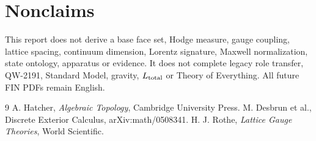 \documentclass[11pt,a4paper]{article}
\begin{document}
\section{Nonclaims}
This report does not derive a base face set, Hodge measure, gauge coupling,
lattice spacing, continuum dimension, Lorentz signature, Maxwell normalization,
state ontology, apparatus or evidence.  It does not complete legacy role
transfer, QW-2191, Standard Model, gravity, $L_{\rm total}$ or Theory of
Everything.  All future FIN PDFs remain English.

\begin{thebibliography}{9}
 A. Hatcher, \emph{Algebraic Topology}, Cambridge University Press.
 M. Desbrun et al., Discrete Exterior Calculus, arXiv:math/0508341.
 H. J. Rothe, \emph{Lattice Gauge Theories}, World Scientific.
\end{thebibliography}
\end{document}
